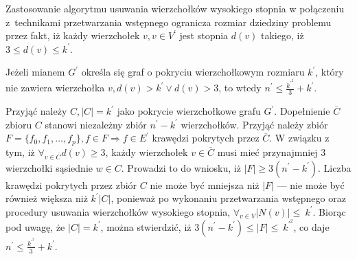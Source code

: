 Zastosowanie algorytmu usuwania wierzchołków wysokiego stopnia w połączeniu 
z~technikami przetwarzania wstępnego ogranicza rozmiar dziedziny problemu przez
fakt, iż każdy wierzchołek $v, v \in V^\prime$ jest stopnia $d(v)$ takiego, iż
$3 \leq d(v) \leq k^\prime$.

\begin{theorem}
  Jeżeli mianem $G^\prime$ określa się graf o pokryciu wierzchołkowym rozmiaru
  $k^\prime$, który nie zawiera wierzchołka $v, d(v) > k^\prime \lor d(v) > 3$, to
  wtedy $n^\prime \leq \frac{k^\prime^2}{3} + k^\prime$.
\end{theorem}
\begin{bproof}
  Przyjąć należy ${C,|C|=k^\prime}$ jako pokrycie wierzchołkowe grafu
  $G^\prime$.
  Dopełnienie $\overline{C}$ zbioru $C$ stanowi niezależny zbiór
  $n^\prime-k^\prime$ wierzchołków.
  Przyjąć należy zbiór $F=\{f_0,f_1, \ldots, f_p\}, f \in F \Rightarrow f \in E^\prime$
  krawędzi pokrytych przez $\overline{C}$.
  W związku z tym, iż $\forall_{v \in \overline{C}}{d(v) \geq 3}$, każdy
  wierzchołek $v \in \overline{C}$ musi mieć przynajmniej 3 wierzchołki sąsiednie
  $w \in C$.
  Prowadzi to do wniosku, iż $|F| \geq 3(n^\prime - k^\prime)$.
  Liczba krawędzi pokrytych przez zbiór $C$ nie może być mniejsza niż $|F|$ --- nie
  może być również większa niż $k^\prime|C|$, ponieważ po wykonaniu
  przetwarzania wstępnego oraz procedury usuwania wierzchołków wysokiego stopnia,
  $\forall_{v \in V}{|N(v)|\leq~k^\prime}$.
  Biorąc pod uwagę, że $|C|=k^\prime$, można stwierdzić, iż
  ${3(n^\prime-k^\prime)\leq|F|\leq~k^\prime^2}$, co daje ${n^\prime\leq\frac{k^\prime^2}{3}+k^\prime}$.
\end{bproof}


